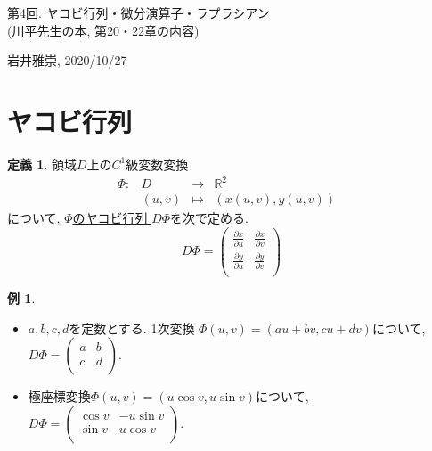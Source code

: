 \documentclass[dvipdfmx,a4paper,11pt]{article}
\newcommand{\R}{\mathbb{R}}
\theoremstyle{definition}
\newtheorem{dfn}[thm]{定義}
\newtheorem{exa}[thm]{例}
\newcommand{\pdrv}[2]{\frac{\partial #1}{\partial #2}}
\begin{document}
\begin{center}
{\Large 第4回. ヤコビ行列・微分演算子・ラプラシアン \\(川平先生の本, 第20・22章の内容)}
\end{center}

\begin{flushright}
 岩井雅崇, 2020/10/27
\end{flushright}


\section{ヤコビ行列}
\begin{tcolorbox}[
    colback = white,
    colframe = green!35!black,
    fonttitle = \bfseries,
    breakable = true]
    \begin{dfn}
 領域$D$上の$C^1$級変数変換
 $$
\begin{array}{ccccc}
\Phi: &D & \rightarrow & \R^2 & \\
&(u,v) & \longmapsto & (x(u,v),y(u,v))&
\end{array}
$$
について, \underline{$\Phi$のヤコビ行列 }$D\Phi$を次で定める.
$$
D\Phi
=
\left(\begin{array}{cc} \pdrv{x}{u} & \pdrv{x}{v} \\ \pdrv{y}{u}& \pdrv{y}{v} \\ \end{array} \right)
$$

    \end{dfn}
    \end{tcolorbox}

\begin{exa}
\text{}
\begin{itemize}
\item $a,b,c,d$を定数とする.
1次変換
$\Phi(u,v)  = (au+bv, cu+dv)$について, 
$D\Phi = \left(\begin{array}{cc} a& b\\ c& d\\ \end{array} \right).$
\item 極座標変換$\Phi(u,v)  = (u \cos v, u \sin v)$について, 
$D\Phi = \left(\begin{array}{cc} \cos v& -u\sin v\\ \sin v& u \cos v\\ \end{array} \right).$
\end{itemize}

\end{exa}
\end{document}
